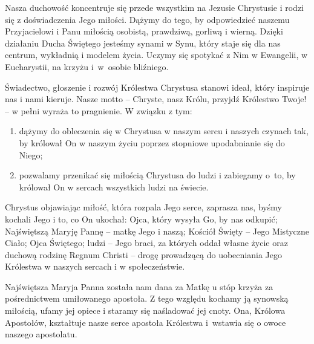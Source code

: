 \filbreak 
{}
 
 Nasza duchowość koncentruje się przede wszystkim na Jezusie Chrystusie i rodzi się z doświadczenia Jego miłości. Dążymy do tego, by odpowiedzieć naszemu Przyjacielowi i Panu miłością osobistą, prawdziwą, gorliwą i wierną. Dzięki działaniu Ducha Świętego jesteśmy synami w Synu, który staje się dla nas centrum, wykładnią i modelem życia. Uczymy się spotykać z Nim w Ewangelii, w Eucharystii, na krzyżu \mbox{i w osobie} bliźniego.
 
 
 {Ś}wiadectwo, głoszenie i rozwój Królestwa Chrystusa stanowi ideał, który inspiruje nas i nami kieruje. Nasze motto – Chryste, nasz Królu, przyjdź Królestwo Twoje! – w pełni wyraża to pragnienie. W związku z tym:


\begin{enumerate}


\item dążymy do obleczenia się w Chrystusa w naszym sercu i naszych czynach tak, by królował On w naszym życiu poprzez stopniowe upodabnianie się do Niego;


\item pozwalamy przenikać się miłością Chrystusa do ludzi i zabiegamy \mbox{o to}, by królował On w sercach wszystkich ludzi na świecie.


\end{enumerate}


 
 Chrystus objawiając miłość, która rozpala Jego serce, zaprasza nas, byśmy kochali Jego i to, co On ukochał: Ojca, który wysyła Go, by nas odkupić; Najświętszą Maryję Pannę – matkę Jego i naszą; Kościół Święty – Jego Mistyczne Ciało; Ojca Świętego; ludzi – Jego braci, za których oddał własne życie oraz duchową rodzinę Regnum Christi – drogę prowadzącą do uobecniania Jego Królestwa w naszych sercach i w społeczeństwie.
 
 
 Najświętsza Maryja Panna została nam dana za Matkę u stóp krzyża za pośrednictwem umiłowanego apostoła. Z tego względu kochamy ją synowską miłością, ufamy jej opiece i staramy się naśladować jej cnoty. Ona, Królowa Apostołów, kształtuje nasze serce apostoła Królestwa \mbox{i wstawia} się o owoce naszego apostolatu.
 
 

